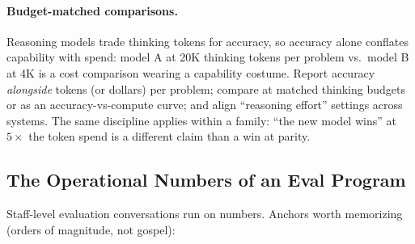 \paragraph{Budget-matched comparisons.}
Reasoning models trade thinking tokens for accuracy, so accuracy alone
conflates capability with spend: model A at 20K thinking tokens per problem
vs.\ model B at 4K is a cost comparison wearing a capability costume.
Report accuracy \emph{alongside} tokens (or dollars) per problem; compare at
matched thinking budgets or as an accuracy-vs-compute curve; and align
``reasoning effort'' settings across systems.  The same discipline applies
within a family: ``the new model wins'' at $5\times$ the token spend is a
different claim than a win at parity.

\subsection{The Operational Numbers of an Eval Program}
\label{sec:eval_ops_numbers}

Staff-level evaluation conversations run on numbers.  Anchors worth
memorizing (orders of magnitude, not gospel):

